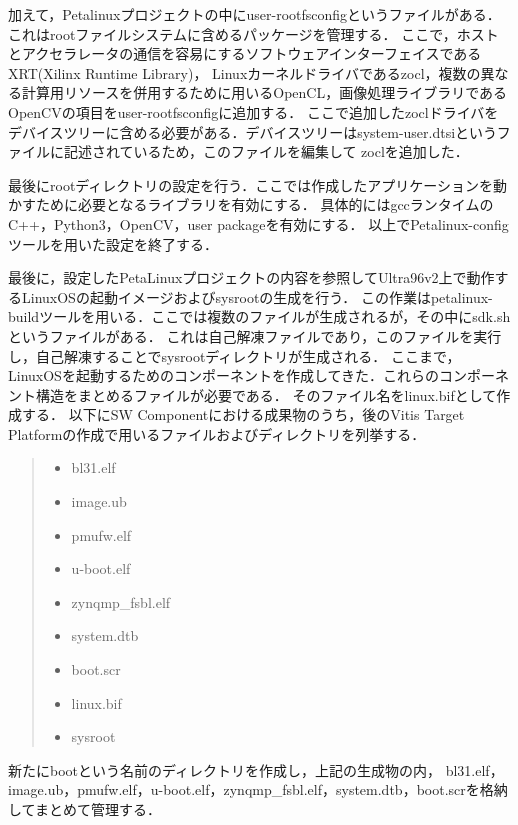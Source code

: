 \documentclass[11pt,a4j]{jreport}
\begin{document}
加えて，Petalinuxプロジェクトの中にuser-rootfsconfigというファイルがある．これはrootファイルシステムに含めるパッケージを管理する．
ここで，ホストとアクセラレータの通信を容易にするソフトウェアインターフェイスであるXRT(Xilinx Runtime Library)，
Linuxカーネルドライバであるzocl，複数の異なる計算用リソースを併用するために用いるOpenCL，画像処理ライブラリであるOpenCVの項目をuser-rootfsconfigに追加する．
ここで追加したzoclドライバをデバイスツリーに含める必要がある．デバイスツリーはsystem-user.dtsiというファイルに記述されているため，このファイルを編集して
zoclを追加した．

最後にrootディレクトリの設定を行う．ここでは作成したアプリケーションを動かすために必要となるライブラリを有効にする．
具体的にはgccランタイムのC++，Python3，OpenCV，user packageを有効にする．
以上でPetalinux-configツールを用いた設定を終了する．

最後に，設定したPetaLinuxプロジェクトの内容を参照してUltra96v2上で動作するLinuxOSの起動イメージおよびsysrootの生成を行う．
この作業はpetalinux-buildツールを用いる．ここでは複数のファイルが生成されるが，その中にsdk.shというファイルがある．
これは自己解凍ファイルであり，このファイルを実行し，自己解凍することでsysrootディレクトリが生成される．
ここまで，LinuxOSを起動するためのコンポーネントを作成してきた．これらのコンポーネント構造をまとめるファイルが必要である．
そのファイル名をlinux.bifとして作成する．
以下にSW Componentにおける成果物のうち，後のVitis Target Platformの作成で用いるファイルおよびディレクトリを列挙する．
\begin{quote}
  \begin{itemize}
    \item bl31.elf
    \item image.ub
    \item pmufw.elf
    \item u-boot.elf
    \item zynqmp_fsbl.elf
    \item system.dtb
    \item boot.scr
    \item linux.bif
    \item sysroot
  \end{itemize}
\end{quote}
新たにbootという名前のディレクトリを作成し，上記の生成物の内，
bl31.elf，image.ub，pmufw.elf，u-boot.elf，zynqmp_fsbl.elf，system.dtb，boot.scrを格納してまとめて管理する．
\end{document}

